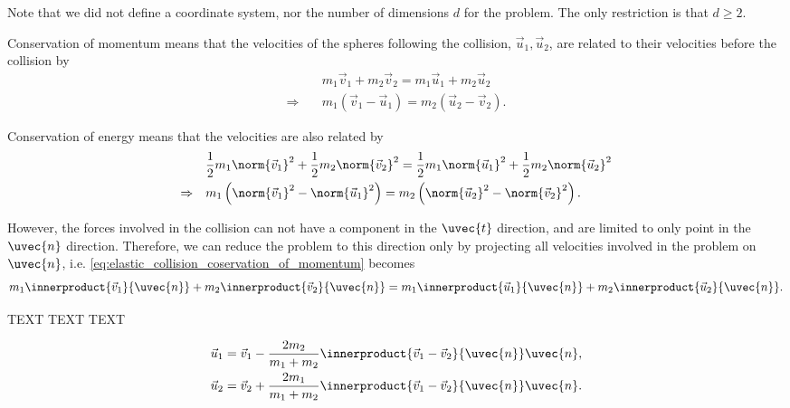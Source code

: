 Note that we did not define a coordinate system, nor the number of dimensions $d$ for the problem. The only restriction is that $d\geq2$.

Conservation of momentum means that the velocities of the spheres following the collision, $\vec{u}_{1},\vec{u}_2$, are related to their velocities before the collision by
\begin{equation}
	\begin{aligned}
		                 & m_{1}\vec{v}_{1} + m_{2}\vec{v}_{2} = m_{1}\vec{u}_{1} + m_{2}\vec{u}_{2}                   \\
		\Rightarrow\quad & m_{1}\left(\vec{v}_{1} - \vec{u}_{1}\right)  = m_{2}\left(\vec{u}_{2} - \vec{v}_{2}\right).
	\end{aligned}
	\label{eq:elastic_collision_coservation_of_momentum}
\end{equation}

Conservation of energy means that the velocities are also related by
\begin{equation}
	\begin{aligned}
		                 & \frac{1}{2}m_{1}\norm{\vec{v}_{1}}^{2} + \frac{1}{2}m_{2}\norm{\vec{v}_{2}}^{2} = \frac{1}{2}m_{1}\norm{\vec{u}_{1}}^{2} + \frac{1}{2}m_{2}\norm{\vec{u}_{2}}^{2} \\
		\Rightarrow\quad & m_{1}\left(\norm{\vec{v}_{1}}^{2} - \norm{\vec{u}_{1}}^{2}\right) = m_{2}\left(\norm{\vec{u}_{2}}^{2} - \norm{\vec{v}_{2}}^{2}\right).
	\end{aligned}
	\label{eq:elastic_collision_coservation_of_energy}
\end{equation}

However, the forces involved in the collision can not have a component in the $\uvec{t}$ direction, and are limited to only point in the $\uvec{n}$ direction. Therefore, we can reduce the problem to this direction only by projecting all velocities involved in the problem on $\uvec{n}$, i.e. \autoref{eq:elastic_collision_coservation_of_momentum} becomes
\begin{equation}
	m_{1}\innerproduct{\vec{v}_{1}}{\uvec{n}} + m_{2}\innerproduct{\vec{v}_{2}}{\uvec{n}} = m_{1}\innerproduct{\vec{u}_{1}}{\uvec{n}} + m_{2}\innerproduct{\vec{u}_{2}}{\uvec{n}}.
	\label{eq:elastic_collision_coservation_of_momentum_projection}
\end{equation}

TEXT TEXT TEXT

\begin{equation}
	\begin{aligned}
		\vec{u}_{1} & = \vec{v}_{1} - \frac{2m_{2}}{m_{1}+m_{2}}\innerproduct{\vec{v}_{1}-\vec{v}_{2}}{\uvec{n}}\uvec{n}, \\
		\vec{u}_{2} & = \vec{v}_{2} + \frac{2m_{1}}{m_{1}+m_{2}}\innerproduct{\vec{v}_{1}-\vec{v}_{2}}{\uvec{n}}\uvec{n}.
	\end{aligned}
\end{equation}

